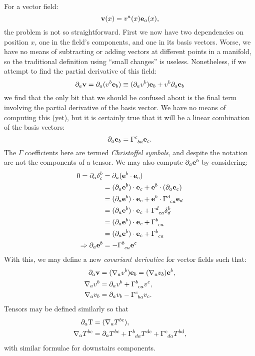 For a vector field:
\begin{equation}
 \mathbf{v}(x) = v^a(x)\mathbf{e}_a(x),
  \label{eqn:dg:vector_field}
\end{equation}
the problem is not so straightforward. First we now have two dependencies on position $x$, one in the field's components, and one in its basis vectors. Worse, we have no means of subtracting or adding vectors at different points in a manifold, so the traditional definition using ``small changes'' is useless. Nonetheless, if we attempt to find the partial derivative of this field:
\begin{equation}
  \partial_a\mathbf{v} = \partial_a(v^b\mathbf{e}_b) \equiv (\partial_a v^b) \mathbf{e}_b + v^b \partial_a\mathbf{e}_b
  \label{eqn:dg:partial_expand}
\end{equation}
we find that the only bit that we should be confused about is the final term involving the partial derivative of the basis vector. We have no means of computing this (yet), but it is certainly true that it will be a linear combination of the basis vectors:
\begin{equation}
  \partial_a\ve_b = \TG{c}{ba} \ve_c.
  \label{eqn:dg:gamma_def}
\end{equation}
The $\Gamma$ coefficients here are termed {\em Christoffel symbols}, and despite the notation are not the components of a tensor. We may also compute $\partial_a \mathbf{e}^b$ by considering:
\begin{align}
  0 = \partial_a \delta^b_c &= \partial_a (\ve^b\cdot\ve_c)  
  \nonumber\\
  &= (\partial_a\ve^b)\cdot\ve_c + \ve^b\cdot(\partial_a\ve_c)
  \nonumber \\
  &= (\partial_a\ve^b)\cdot\ve_c + \ve^b\cdot\TG{d}{ca} \ve_d 
  \nonumber \\
  &= (\partial_a\ve^b)\cdot\ve_c + \TG{d}{ca} \delta^b_d
  \nonumber \\
  &= (\partial_a\ve^b)\cdot\ve_c + \TG{b}{ca} 
  \nonumber \\
  &= (\partial_a\ve^b)\cdot\ve_c + \TG{b}{ca} 
  \nonumber \\
  \Rightarrow \partial_a\ve^b
  &=  - \TG{b}{ca} \ve^c
  \label{eqn:dg:chris_deriv}
\end{align}
With this, we may define a new {\em covariant derivative\/} for vector fields such that:
\begin{align}
  \partial_a\vv &= (\nabla_a v^b) \ve_b = (\nabla_a v_b) \ve^b,
  \\
  \nabla_a v^b &= \partial_a v^b + \TG{b}{ca} v^c,
   \\
   \nabla_a v_b &= \partial_a v_b - \TG{c}{ba} v_c.
\end{align}
Tensors may be defined similarly so that
\begin{align}
  \partial_a \uT &= (\nabla_a T^{bc}),
  \\
  \nabla_a T^{bc} &= \partial_a T^{bc} + \TG{b}{da}T^{dc} + \TG{c}{da}T^{bd},
\end{align}
with similar formulae for downstairs components.

